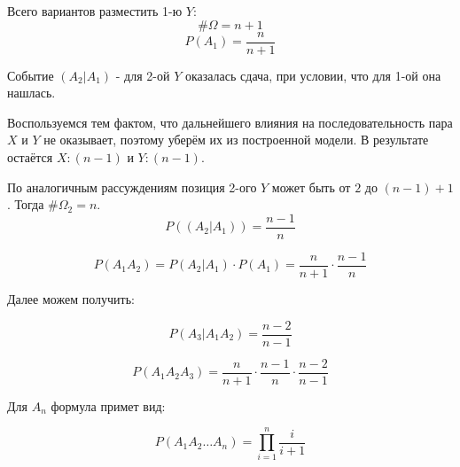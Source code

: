 Всего вариантов разместить 1-ю $Y$:
\[ \# \Omega = n + 1 \]
\[ P(A_1) = \dfrac{n}{n+1} \]

Событие $(A_2|A_1)$ - для 2-ой $Y$ оказалась сдача, при условии, что для 1-ой она нашлась.

Воспользуемся тем фактом, что дальнейшего влияния на последовательность пара $X$ и $Y$ не оказывает, поэтому уберём их из построенной модели. В результате остаётся $X: (n-1)$ и $Y: (n-1)$.

По аналогичным рассуждениям позиция 2-ого $Y$ может быть от $2$ до $(n-1)+1$. Тогда $\# \Omega_2 = n$.
\[ P((A_2|A_1)) = \dfrac{n-1}{n} \]

\[ P(A_1A_2) = P(A_2|A_1) \cdot P(A_1) = \dfrac{n}{n+1} \cdot \dfrac{n-1}{n} \]

Далее можем получить:

\[ P(A_3|A_1A_2) = \dfrac{n-2}{n-1} \]

\[ P(A_1A_2A_3) = \dfrac{n}{n+1} \cdot \dfrac{n-1}{n} \cdot \dfrac{n-2}{n-1} \]

Для $A_n$ формула примет вид:

\[ P(A_1A_2 \dots A_n) = \prod_{i = 1}^{n} \dfrac{i}{i + 1} \]

